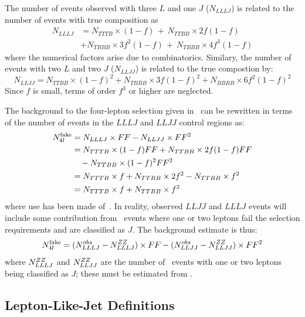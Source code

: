 The number of events observed with three $L$ and one $J$ ($N_{LLLJ}$) is related to
the number of events with true composition as
\begin{align}
N_{LLLJ} &= N_{TTTB} \times (1-f)\, +\, N_{TTBB} \times 2f(1-f) \\
         &+ N_{TBBB} \times 3f^{2}(1-f)\, +\,  N_{TBBB} \times 4f^{3}(1-f) 
\end{align}
where the numerical factors arise due to combinatorics. Similary, the number of events with two $L$ and two $J$ ($N_{LLJJ}$) is related to the
true compostion by:
\begin{equation}
N_{LLJJ} = N_{TTBB} \times (1-f)^{2} + N_{TBBB} \times 3 f(1-f)^{2}  + N_{BBBB}
\times 6 f^{2}(1-f)^{2}
\end{equation}
Since $f$ is small,
terms of order $f^{3}$ or higher are neglected.

The background to the four-lepton selection given in~ can 
be rewritten in terms of the number of events in the $LLLJ$ and $LLJJ$ control
regions as:
\begin{align}
N_{4l}^{\rm fake} &= N_{LLLJ} \times FF - N_{LLJJ} \times FF^{2} \\
 &= N_{TTTB} \times (1-f) FF + N_{TTBB} \times 2f (1 - f) FF \\
 &\quad - N_{TTBB} \times (1-f)^{2} FF^{2} \\
 &=  N_{TTTB} \times f + N_{TTBB} \times 2 f^{2} - N_{TTBB} \times f^{2} \\
 &= N_{TTTB} \times f + N_{TTBB} \times f^{2} 
\end{align}
where use has been made of~. In reality, observed
$LLJJ$ and $LLLJ$ events will include some contribution from \ZZllll\ events where
one or two leptons fail the selection requirements and are classified as $J$.
The background estimate is thus:
\begin{equation}
N_{4l}^{\rm fake} = (N^{obs}_{LLLJ} - N^{ZZ}_{LLLJ}) \times FF -
(N^{obs}_{LLJJ} - N^{ZZ}_{LLJJ})\times FF^{2} 
\end{equation}
where $N^{ZZ}_{LLLJ}$ and $N^{ZZ}_{LLJJ}$ are the number of \ZZ\ events with
one or two leptons being classified as $J$; these must be estimated from \mc.

\subsection{Lepton-Like-Jet Definitions}

